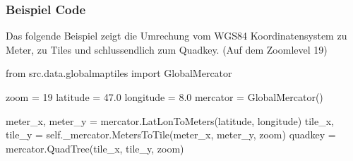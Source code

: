 \subsubsection{Beispiel Code}
Das folgende Beispiel zeigt die Umrechung vom WGS84 Koordinatensystem zu Meter, zu Tiles und schlussendlich zum Quadkey. (Auf dem Zoomlevel 19) \\
\begin{python}
	from src.data.globalmaptiles import GlobalMercator
	
	zoom = 19
	latitude = 47.0
	longitude = 8.0
	mercator = GlobalMercator()
	
	meter_x, meter_y = mercator.LatLonToMeters(latitude, longitude)
	tile_x, tile_y = self._mercator.MetersToTile(meter_x, meter_y, zoom)
	quadkey = mercator.QuadTree(tile_x, tile_y, zoom)
\end{python}



